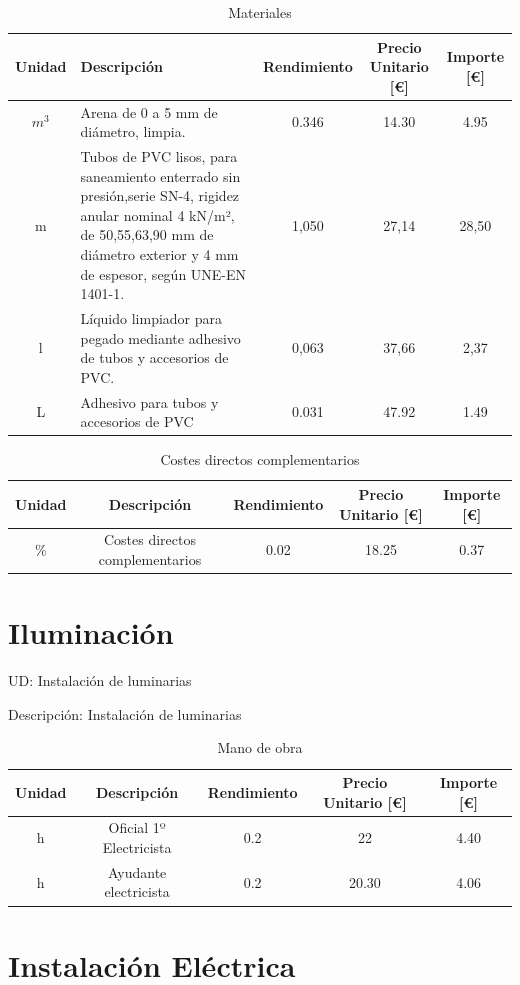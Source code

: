 \documentclass[../main.tex]{subfiles}
\begin{document}
\begin{table}[H]
    \centering
    \begin{tabular}{c|p{5.5cm}|c|c|c}
    Unidad & Descripción & Rendimiento & Precio Unitario [€] & Importe [€] \\ \hline
    $m^3$ & Arena de 0 a 5 mm de diámetro, limpia.& 0.346 & 14.30 & 4.95 \\ 
    m & Tubos de PVC lisos, para saneamiento enterrado sin presión,serie SN-4, rigidez anular nominal 4 kN/m², de 50,55,63,90 mm de diámetro exterior y 4 mm de espesor, según UNE-EN 1401-1. &1,050 & 27,14 & 28,50 \\
    l & Líquido limpiador para pegado mediante adhesivo de tubos y accesorios de PVC. & 0,063 & 37,66 & 2,37 \\
    L & Adhesivo para tubos y accesorios de PVC & 0.031 & 47.92 & 1.49 \\
    \end{tabular}
    \caption{Materiales}
\end{table}

\begin{table}[H]
    \centering
    \begin{tabular}{c|c|c|c|c}
    Unidad & Descripción & Rendimiento & Precio Unitario [€] & Importe [€] \\ \hline
    \% & Costes directos complementarios & 0.02 & 18.25 & 0.37 \\
    \end{tabular}
    \caption{Costes directos complementarios}
\end{table} 

\section{Iluminación}

UD: Instalación de luminarias

Descripción: Instalación de luminarias

\begin{table}[H]
    \centering
    \begin{tabular}{c|c|c|c|c}
    Unidad & Descripción & Rendimiento & Precio Unitario [€] & Importe [€] \\ \hline
    h&Oficial 1º Electricista & 0.2 & 22 & 4.40 \\
    h&Ayudante electricista & 0.2 & 20.30 & 4.06 \\
    
    \end{tabular}
    \caption{Mano de obra}
\end{table}




\section{Instalación Eléctrica}




\end{document}
